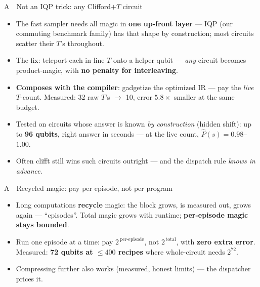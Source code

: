 \documentclass[aspectratio=169,11pt]{beamer}
\newcommand{\punch}[1]{{\color{framerule}\bfseries #1}}
\begin{document}
\begin{frame}{A \,\textperiodcentered\, Not an IQP trick: any Clifford$+T$ circuit}
  \begin{itemize}
    \item The fast sampler needs all magic in \punch{one up-front layer} --- IQP (our commuting benchmark family) has that shape by construction; most circuits scatter their $T$'s throughout.
    \item The fix: teleport each in-line $T$ onto a helper qubit --- \emph{any} circuit becomes product-magic, with \punch{no penalty for interleaving}.
    \item \punch{Composes with the compiler}: gadgetize the optimized IR --- pay the \emph{live} $T$-count. Measured: 32 raw $T$'s $\to$ 10, error $5.8\times$ smaller at the same budget.
    \item Tested on circuits whose answer is known \emph{by construction} (hidden shift): up to \punch{96 qubits}, right answer in seconds --- at the live count, $\hat P(s)=0.98$--$1.00$.
    \item Often clifft still wins such circuits outright --- and the dispatch rule \emph{knows in advance}.
  \end{itemize}
\end{frame}

\begin{frame}{A \,\textperiodcentered\, Recycled magic: pay per episode, not per program}
  \begin{itemize}
    \item Long computations \punch{recycle} magic: the block grows, is measured out, grows again --- ``episodes''. Total magic grows with runtime; \punch{per-episode magic stays bounded}.
    \item Run one episode at a time: pay $2^{\,\text{per-episode}}$, not $2^{\,\text{total}}$, with \punch{zero extra error}. Measured: \punch{72 qubits at $\le\!400$ recipes} where whole-circuit needs $2^{72}$.
    \item Compressing further also works (measured, honest limits) --- the dispatcher prices it.
  \end{itemize}
\end{frame}
\end{document}
